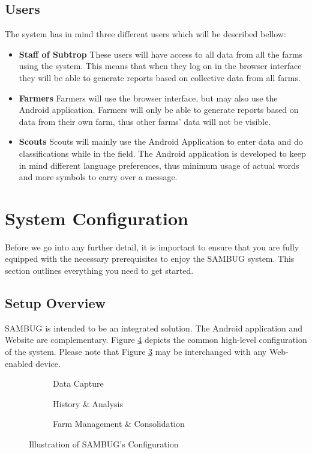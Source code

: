 \documentclass[11pt,a4paper,titlepage]{article}
\begin{document}
\subsection{Users}
The system has in mind three different users which will be described bellow:
	\begin{itemize}
		\item \textbf{Staff of Subtrop} These users will have access to all data from all the farms using the system. This means that when they log on in the browser interface they will be able to generate reports based on collective data from all farms.
		\item \textbf{Farmers} Farmers will use the browser interface, but may also use the Android application. Farmers will only be able to generate reports based on data from their own farm, thus other farms' data will not be visible. 
		\item \textbf{Scouts} Scouts will mainly use the Android Application to enter data and do classifications while in the field. The Android application is developed to keep in mind different language preferences, thus minimum usage of actual words and more symbols to carry over a message.
	\end{itemize}



\section{System Configuration}
Before we go into any further detail, it is important to ensure that you are fully equipped with the necessary prerequisites to enjoy the SAMBUG system. This section outlines everything you need to get started.
\subsection{Setup Overview}
SAMBUG is intended to be an integrated solution. The Android application and Website are complementary. Figure \ref{fig:layout} depicts the common high-level configuration of the system. Please note that Figure \ref{fig:Web} may be interchanged with any Web-enabled device.
	\begin{figure}[h]
		\begin{subfigure}{0.3\textwidth}
		\caption{Data Capture}		
		\label{fig:dataCapt}	
		\end{subfigure}
		\begin{subfigure}{0.3\textwidth}
		\caption{History \& Analysis}		
		\label{fig:Engine}	
		\end{subfigure}
		\begin{subfigure}{0.3\textwidth}
		\caption{Farm Management \& Consolidation}	
		\label{fig:Web}		
		\end{subfigure}
	\caption{Illustration of SAMBUG's Configuration}
	\label{fig:layout}
	\end{figure}
\end{document}
